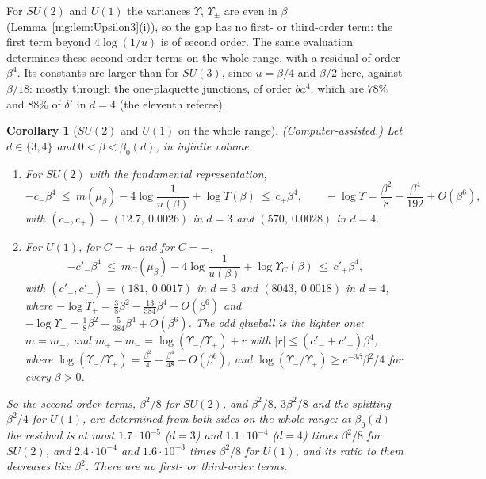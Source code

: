 \documentclass[11pt,a4paper]{article}
\newtheorem{corollary}[theorem]{Corollary}
\theoremstyle{definition}
\theoremstyle{remark}
\begin{document}
For $SU(2)$ and $U(1)$ the variances $\Upsilon$, $\Upsilon_\pm$ are even in $\beta$ (Lemma~\ref{mg:lem:Upsilon3}(i)), so the gap has no first- or third-order term: the first term beyond
$4\log(1/u)$ is of second order. The same evaluation determines these second-order terms on the whole range, with a residual of order $\beta^4$. Its constants are larger than for $SU(3)$,
since $u=\beta/4$ and $\beta/2$ here, against $\beta/18$: mostly through the one-plaquette junctions, of order $ba^4$, which are $78\%$ and $88\%$ of $\delta'$ in $d=4$ (the eleventh
referee).

\begin{corollary}[$SU(2)$ and $U(1)$ on the whole range]\label{mg:cor:classic}
(Computer-assisted.) Let $d\in\{3,4\}$ and $0<\beta<\beta_0(d)$, in infinite volume.
\begin{enumerate}[label=(\roman*)]
\item For $SU(2)$ with the fundamental representation,
\[
-c_-\beta^4\ \le\ m(\mu_\beta)-4\log\frac1{u(\beta)}+\log\Upsilon(\beta)\ \le\ c_+\beta^4,\qquad -\log\Upsilon=\frac{\beta^2}8-\frac{\beta^4}{192}+O(\beta^6),
\]
with $(c_-,c_+)=(12.7,\ 0.0026)$ in $d=3$ and $(570,\ 0.0028)$ in $d=4$.
\item For $U(1)$, for $C=+$ and for $C=-$,
\[
-c'_-\beta^4\ \le\ m_C(\mu_\beta)-4\log\frac1{u(\beta)}+\log\Upsilon_C(\beta)\ \le\ c'_+\beta^4,
\]
with $(c'_-,c'_+)=(181,\ 0.0017)$ in $d=3$ and $(8043,\ 0.0018)$ in $d=4$, where $-\log\Upsilon_+=\frac38\beta^2-\frac{13}{384}\beta^4+O(\beta^6)$ and
$-\log\Upsilon_-=\frac18\beta^2-\frac5{384}\beta^4+O(\beta^6)$. The odd glueball is the lighter one: $m=m_-$, and $m_+-m_-=\log(\Upsilon_-/\Upsilon_+)+r$ with
$|r|\le(c'_-+c'_+)\beta^4$, where $\log(\Upsilon_-/\Upsilon_+)=\frac{\beta^2}4-\frac{\beta^4}{48}+O(\beta^6)$, and $\log(\Upsilon_-/\Upsilon_+)\ge e^{-3\beta}\beta^2/4$ for every $\beta>0$.
\end{enumerate}
So the second-order terms, $\beta^2/8$ for $SU(2)$, and $\beta^2/8$, $3\beta^2/8$ and the splitting $\beta^2/4$ for $U(1)$, are determined from both sides on the whole range: at $\beta_0(d)$
the residual is at most $1.7\cdot10^{-5}$ ($d=3$) and $1.1\cdot10^{-4}$ ($d=4$) times $\beta^2/8$ for $SU(2)$, and $2.4\cdot10^{-4}$ and $1.6\cdot10^{-3}$ times $\beta^2/8$ for $U(1)$, and its ratio
to them decreases like $\beta^2$. There are no first- or third-order terms.
\end{corollary}
\end{document}
